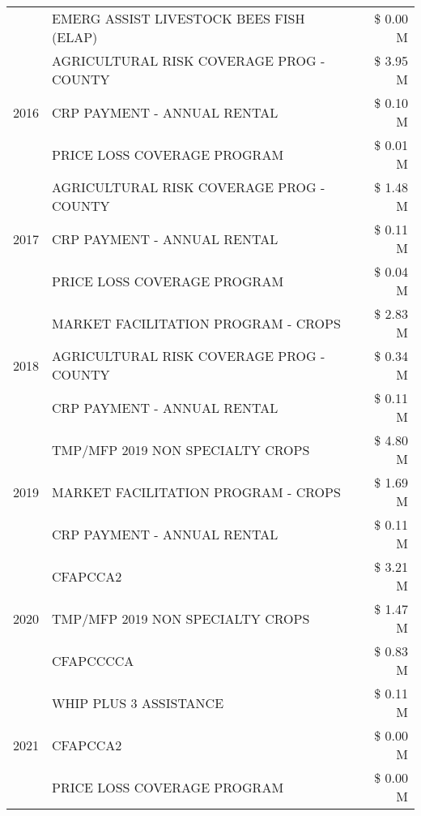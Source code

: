 \begin{tabular}{llr}
 & EMERG ASSIST LIVESTOCK BEES FISH (ELAP) & \$ 0.00 M \\
\cline{1-3}
\multirow[t]{3}{*}{2016} & AGRICULTURAL RISK COVERAGE PROG - COUNTY      & \$ 3.95 M \\
 & CRP PAYMENT - ANNUAL RENTAL                   & \$ 0.10 M \\
 & PRICE LOSS COVERAGE PROGRAM                   & \$ 0.01 M \\
\cline{1-3}
\multirow[t]{3}{*}{2017} & AGRICULTURAL RISK COVERAGE PROG - COUNTY & \$ 1.48 M \\
 & CRP PAYMENT - ANNUAL RENTAL & \$ 0.11 M \\
 & PRICE LOSS COVERAGE PROGRAM & \$ 0.04 M \\
\cline{1-3}
\multirow[t]{3}{*}{2018} & MARKET FACILITATION PROGRAM - CROPS & \$ 2.83 M \\
 & AGRICULTURAL RISK COVERAGE PROG - COUNTY & \$ 0.34 M \\
 & CRP PAYMENT - ANNUAL RENTAL & \$ 0.11 M \\
\cline{1-3}
\multirow[t]{3}{*}{2019} & TMP/MFP 2019 NON SPECIALTY CROPS & \$ 4.80 M \\
 & MARKET FACILITATION PROGRAM - CROPS & \$ 1.69 M \\
 & CRP PAYMENT - ANNUAL RENTAL & \$ 0.11 M \\
\cline{1-3}
\multirow[t]{3}{*}{2020} & CFAPCCA2 & \$ 3.21 M \\
 & TMP/MFP 2019 NON SPECIALTY CROPS & \$ 1.47 M \\
 & CFAPCCCCA & \$ 0.83 M \\
\cline{1-3}
\multirow[t]{3}{*}{2021} & WHIP PLUS 3 ASSISTANCE & \$ 0.11 M \\
 & CFAPCCA2 & \$ 0.00 M \\
 & PRICE LOSS COVERAGE PROGRAM & \$ 0.00 M \\
\cline{1-3}
\bottomrule
\end{tabular}

